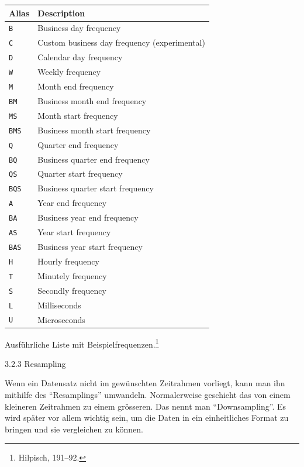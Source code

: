 \documentclass[
  ngerman,
  a4paper,
  DIV=11,
  oneside]{scrreprt}
\newcounter{none} %
\begin{document}
{\def\LTcaptype{none} %
\begin{longtable}[]{@{}ll@{}}
\toprule\noalign{}
Alias & Description \\
\midrule\noalign{}
\endhead
\bottomrule\noalign{}
\endlastfoot
\texttt{B} & Business day frequency \\
\texttt{C} & Custom business day frequency (experimental) \\
\texttt{D} & Calendar day frequency \\
\texttt{W} & Weekly frequency \\
\texttt{M} & Month end frequency \\
\texttt{BM} & Business month end frequency \\
\texttt{MS} & Month start frequency \\
\texttt{BMS} & Business month start frequency \\
\texttt{Q} & Quarter end frequency \\
\texttt{BQ} & Business quarter end frequency \\
\texttt{QS} & Quarter start frequency \\
\texttt{BQS} & Business quarter start frequency \\
\texttt{A} & Year end frequency \\
\texttt{BA} & Business year end frequency \\
\texttt{AS} & Year start frequency \\
\texttt{BAS} & Business year start frequency \\
\texttt{H} & Hourly frequency \\
\texttt{T} & Minutely frequency \\
\texttt{S} & Secondly frequency \\
\texttt{L} & Milliseconds \\
\texttt{U} & Microseconds \\
\end{longtable}
}

Ausführliche Liste mit Beispielfrequenzen.\footnote{Hilpisch, 191--92.}

3.2.3 Resampling

Wenn ein Datensatz nicht im gewünschten Zeitrahmen vorliegt, kann man
ihn mithilfe des ``Resamplings'' umwandeln. Normalerweise geschieht das
von einem kleineren Zeitrahmen zu einem grösseren. Das nennt man
``Downsampling''. Es wird später vor allem wichtig sein, um die Daten in
ein einheitliches Format zu bringen und sie vergleichen zu können.
\end{document}
